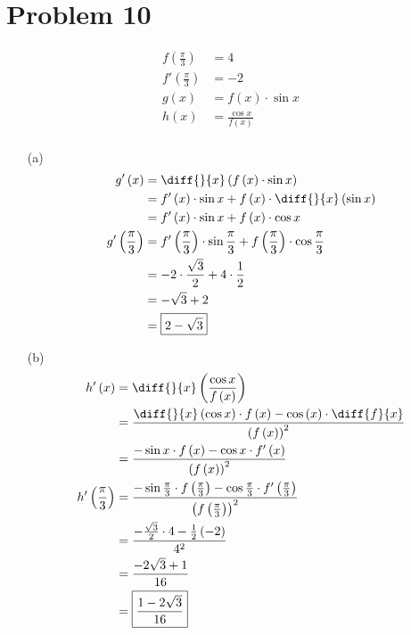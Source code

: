 \documentclass{article}
\begin{document}
\section*{Problem 10}
\begin{align*}
    f\left(\frac{\pi}{3}\right)&=4 \\
    f'\left(\frac{\pi}{3}\right)&=-2 \\
    g\left(x\right)&=f\left(x\right)\cdot\sin x \\
    h\left(x\right)&=\frac{\cos x}{f\left(x\right)} \\
\end{align*}
\begin{itemize}
\item[(a)]
    \begin{align*}
        g'\left(x\right)&=\diff{}{x}\left(f\left(x\right)\cdot\sin x\right) \\
        &=f'\left(x\right)\cdot\sin x+f\left(x\right)\cdot\diff{}{x}\left(\sin x\right)\\
        &=f'\left(x\right)\cdot\sin x+f\left(x\right)\cdot\cos x\\
        g'\left(\frac{\pi}{3}\right)&=f'\left(\frac{\pi}{3}\right)\cdot\sin \frac{\pi}{3}+f\left(\frac{\pi}{3}\right)\cdot\cos\frac{\pi}{3} \\
        &=-2\cdot\frac{\sqrt{3}}{2}+4\cdot\frac{1}{2} \\
        &=-\sqrt{3}+2 \\
        &=\boxed{2-\sqrt{3}} \\
    \end{align*}

\item[(b)]
    \begin{align*}
        h'\left(x\right)&=\diff{}{x}\left(\frac{\cos x}{f\left(x\right)}\right) \\
        &=\frac{\diff{}{x}\left(\cos x\right)\cdot f\left(x\right)-\cos\left(x\right)\cdot\diff{f}{x}}{\left(f\left(x\right)\right)^2} \\
        &=\frac{-\sin x\cdot f\left(x\right)-\cos x\cdot f'\left(x\right)}{\left(f\left(x\right)\right)^2} \\
        h'\left(\frac{\pi}{3}\right)&=\frac{-\sin\frac{\pi}{3}\cdot f\left(\frac{\pi}{3}\right)-\cos\frac{\pi}{3}\cdot f'\left(\frac{\pi}{3}\right)}{\left(f\left(\frac{\pi}{3}\right)\right)^2} \\
        &=\frac{-\frac{\sqrt{3}}{2}\cdot4-\frac{1}{2}\left(-2\right)}{4^2} \\
        &=\frac{-2\sqrt{3}+1}{16} \\
        &=\boxed{\frac{1-2\sqrt{3}}{16}} \\
    \end{align*}
\end{itemize}
\end{document}
